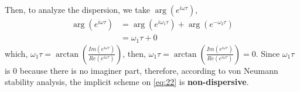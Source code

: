 \documentclass[a4paper,12pt]{article}
\begin{document}
\begin{enumerate}
	Then, to analyze the dispersion, we take $\arg(e^{i\omega\tau})$,
	\begin{equation}\label{eq:28}
	\begin{aligned}
	\arg(e^{i\omega\tau}) &= \arg(e^{i\omega_1\tau}) + \arg(e^{-\omega_2\tau})\\
	&= \omega_1\tau + 0
	\end{aligned}
	\end{equation}
	which, $\omega_1\tau = \arctan\left(\frac{Im(e^{i\omega \tau})}{Re(e^{i\omega \tau})}\right)$,
	then, $\omega_1\tau = \arctan\left(\frac{Im(e^{i\omega \tau})}{Re(e^{i\omega \tau})}\right) = 0$. Since $\omega_1\tau$ is 0 because there is no imaginer part, therefore, according to von Neumann stability analysis, the implicit scheme on \eqref{eq:22} is \textbf{non-dispersive}.
\end{enumerate}
\end{document}
